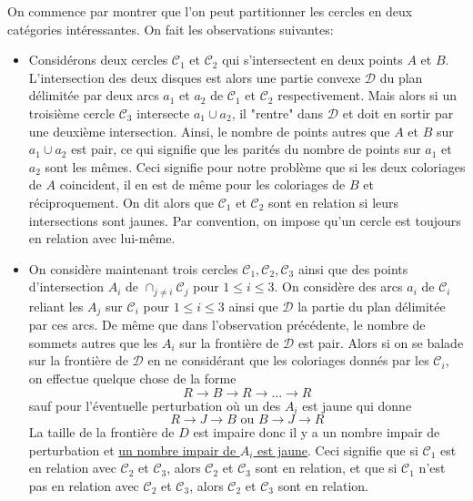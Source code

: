 \begin{sol}
On commence par montrer que l'on peut partitionner les cercles en deux catégories intéressantes. On fait les observations suivantes:

\begin{itemize}
    \item Considérons deux cercles $\mathcal{C}_1$ et $\mathcal{C}_2$ qui s'intersectent en deux points $A$ et $B$. L'intersection des deux disques est alors une partie convexe $\mathcal{D}$ du plan délimitée par deux arcs $a_1$ et $a_2$ de $\mathcal{C}_1$ et $\mathcal{C}_2$ respectivement. Mais alors si un troisième cercle $\mathcal{C}_3$ intersecte $a_1\cup a_2$, il "rentre" dans $\mathcal{D}$ et doit en sortir par une deuxième intersection. Ainsi, le nombre de points autres que $A$ et $B$ sur $a_1\cup a_2$ est pair, ce qui signifie que les parités du nombre de points sur $a_1$ et $a_2$ sont les mêmes. Ceci signifie pour notre problème que si les deux coloriages de $A$ coincident, il en est de même pour les coloriages de $B$ et réciproquement. On dit alors que $\mathcal{C}_1$ et $\mathcal{C}_2$ sont en relation si leurs intersections sont jaunes. Par convention, on impose qu'un cercle est toujours en relation avec lui-même.
    \item On considère maintenant trois cercles $\mathcal{C}_1,\mathcal{C}_2,\mathcal{C}_3$ ainsi que des points d'intersection $A_i$ de $\cap_{j\ne i}\mathcal{C}_j$ pour $1\le i\le 3$. On considère des arcs $a_i$ de $\mathcal{C}_i$ reliant les $A_j$ sur $\mathcal{C}_i$ pour $1\le i\le 3$ ainsi que $\mathcal{D}$ la partie du plan délimitée par ces arcs. De même que dans l'observation précédente, le nombre de sommets autres que les $A_i$ sur la frontière de $\mathcal{D}$ est pair. Alors si on se balade sur la frontière de $\mathcal{D}$ en ne considérant que les coloriages donnés par les $\mathcal{C}_i$, on effectue quelque chose de la forme
    $$R \rightarrow B \rightarrow R \rightarrow \ldots\rightarrow R$$
    sauf pour l'éventuelle perturbation où un des $A_i$ est jaune qui donne
    $$R\rightarrow J \rightarrow B\text{ ou } B\rightarrow J \rightarrow R$$
    La taille de la frontière de $D$ est impaire donc il y a un nombre impair de perturbation et \underline{un nombre impair de $A_i$ est jaune}. Ceci signifie que si $\mathcal{C}_1$ est en relation avec $\mathcal{C}_2$ et $\mathcal{C}_3$, alors $\mathcal{C}_2$ et $\mathcal{C}_3$ sont en relation, et que si $\mathcal{C}_1$ n'est pas en relation avec $\mathcal{C}_2$ et $\mathcal{C}_3$, alors $\mathcal{C}_2$ et $\mathcal{C}_3$ sont en relation.


\end{itemize}
\end{sol}
